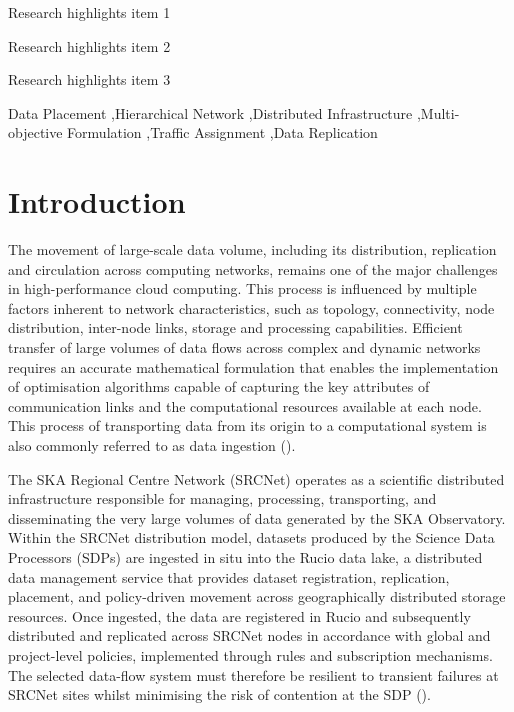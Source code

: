 \documentclass[a4paper,fleqn]{cas-dc}
\begin{document}

\begin{highlights}
\item Research highlights item 1
\item Research highlights item 2
\item Research highlights item 3
\end{highlights}



\begin{keywords}
 Data Placement \sep Hierarchical Network \sep Distributed Infrastructure \sep Multi-objective Formulation \sep Traffic Assignment \sep Data Replication
\end{keywords}

\maketitle


\section{Introduction}
\label{Intro}

The movement of large-scale data volume, including its distribution, replication and circulation across computing networks, remains one of the major challenges in high-performance cloud computing. This process is influenced by multiple factors inherent to network characteristics, such as topology, connectivity, node distribution, inter-node links, storage and processing capabilities. Efficient transfer of large volumes of data flows across complex and dynamic networks requires an accurate mathematical formulation that enables the implementation of optimisation algorithms capable of capturing the key attributes of communication links and the computational resources available at each node. This process of transporting data from its origin to a computational system is also commonly referred to as data ingestion (\citealp{meehan2017data}). 

The SKA Regional Centre Network (SRCNet) operates as a scientific distributed infrastructure responsible for managing, processing, transporting, and disseminating the very large volumes of data generated by the SKA Observatory. Within the SRCNet distribution model, datasets produced by the Science Data Processors (SDPs) are ingested in situ into the Rucio data lake, a distributed data management service that provides dataset registration, replication, placement, and policy-driven movement across geographically distributed storage resources. Once ingested, the data are registered in Rucio and subsequently distributed and replicated across SRCNet nodes in accordance with global and project-level policies, implemented through rules and subscription mechanisms. The selected data-flow system must therefore be resilient to transient failures at SRCNet sites whilst minimising the risk of contention at the SDP (\citealp{srcnet}).
\end{document}
